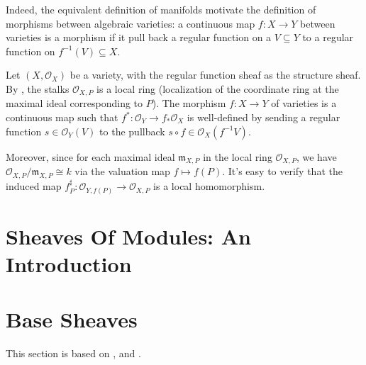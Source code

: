 \documentclass[11pt]{article}
\begin{document}
Indeed, the equivalent definition of manifolds motivate the definition of morphisms between algebraic 
varieties: a continuous map $ f:X \to Y $  between varieties is a morphism if it pull back a regular function on 
a $ V \subseteq Y$ to a regular function on $ f^{-1}(V) \subseteq X $. 

\begin{example}
  Let $ (X, \mathscr{O}_{X}) $ be a variety, with the regular function sheaf as the structure sheaf. 
  By \cite[Theorem 3.2, 3.4]{hartsAG}, the stalks $ \mathscr{O}_{X,P} $ is a local ring 
  (localization of the coordinate ring at the maximal ideal corresponding to $ P $). 
  The morphism $ f: X \to Y $ of varieties is a continuous map such that 
  $ f^{*} : \mathscr{O}_{Y} \to f_{*}\mathscr{O}_{X} $ is well-defined by sending a regular function 
  $ s \in \mathscr{O}_{Y}(V) $ to the pullback $ s \circ f \in \mathscr{O}_{X}(f^{-1}V) $. 

  Moreover, since for each maximal ideal $ \mathfrak{m}_{X,P} $ in the local ring $ \mathscr{O}_{X,P} $, 
  we have $  \mathscr{O}_{X,P} / \mathfrak{m}_{X,P} \cong k $ via the valuation map $ f \mapsto f(P) $. 
  It's easy to verify that the induced map $ f^{\sharp}_{P}: \mathscr{O}_{Y,f(P)} \to \mathscr{O}_{X,P} $ 
  is a local homomorphism. 
\end{example}

\section{Sheaves Of Modules: An Introduction}




\section{Base Sheaves}

This section is based on \cite[Proposition I-12]{EisenbudHarris}, 
\cite[2.5 Recovering sheaves from a ``sheaf on a base'']{vakilTheRisingSea} 
and \cite[6.30 Bases and sheaves]{stacks}. 
\end{document}
